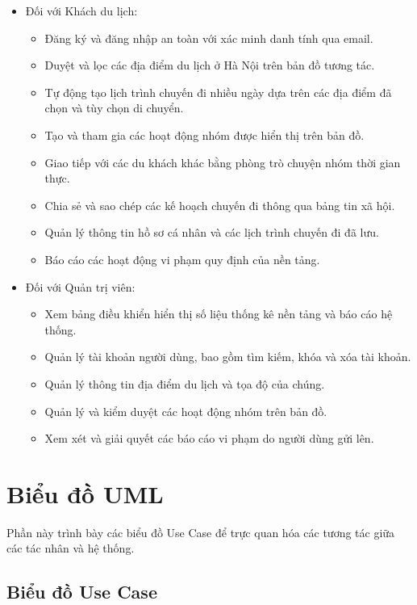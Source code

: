 \documentclass[a4paper,12pt]{report}
\begin{document}
\begin{itemize}
    \item Đối với Khách du lịch:
    \begin{itemize}
        \item Đăng ký và đăng nhập an toàn với xác minh danh tính qua email.
        \item Duyệt và lọc các địa điểm du lịch ở Hà Nội trên bản đồ tương tác.
        \item Tự động tạo lịch trình chuyến đi nhiều ngày dựa trên các địa điểm đã chọn và tùy chọn di chuyển.
        \item Tạo và tham gia các hoạt động nhóm được hiển thị trên bản đồ.
        \item Giao tiếp với các du khách khác bằng phòng trò chuyện nhóm thời gian thực.
        \item Chia sẻ và sao chép các kế hoạch chuyến đi thông qua bảng tin xã hội.
        \item Quản lý thông tin hồ sơ cá nhân và các lịch trình chuyến đi đã lưu.
        \item Báo cáo các hoạt động vi phạm quy định của nền tảng.
    \end{itemize}
 
    \item Đối với Quản trị viên:
    \begin{itemize}
        \item Xem bảng điều khiển hiển thị số liệu thống kê nền tảng và báo cáo hệ thống.
        \item Quản lý tài khoản người dùng, bao gồm tìm kiếm, khóa và xóa tài khoản.
        \item Quản lý thông tin địa điểm du lịch và tọa độ của chúng.
        \item Quản lý và kiểm duyệt các hoạt động nhóm trên bản đồ.
        \item Xem xét và giải quyết các báo cáo vi phạm do người dùng gửi lên.
    \end{itemize}
\end{itemize}

\section{Biểu đồ UML}

Phần này trình bày các biểu đồ Use Case để trực quan hóa các tương tác giữa các tác nhân và hệ thống.

\subsection{Biểu đồ Use Case}
\end{document}
